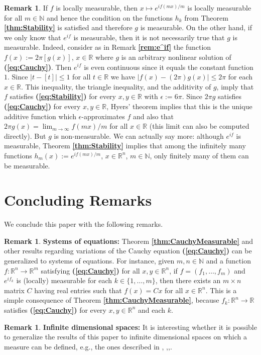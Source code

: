 \documentclass[12 pt]{amsart}
\theoremstyle{definition}
\newtheorem{remark}[thm]{Remark}
\newcommand{\R}{\mathbb{R}}
\newcommand{\N}{\mathbb{N}}
\newcommand{\bref}[1]{\textbf{\ref{#1}}} %
\newcommand{\beqref}[1]{\textbf{(\ref{#1})}} %
\begin{document}
\begin{remark}\label{rem:exp_fm}
If $f$ is locally measurable, then $x\mapsto e^{if(mx)/m}$ is locally measurable for all $m\in\N$ and hence the condition on the functions $h_k$ from Theorem \bref{thm:Stability} is satisfied and therefore $g$ is measurable. On the other hand, if we only know that $e^{if}$ is measurable, then it is not necessarily true that $g$ is measurable. Indeed, consider as in Remark \bref{rem:e^if} 
the function $f(x):=2\pi[g(x)]$, $x\in\R$ where $g$ is an arbitrary nonlinear solution of \beqref{eq:Cauchy}. 
Then $e^{if}$ is even continuous since it equals the constant function $1$. Since $|t-[t]|\leq 1$ for all $t\in\R$ we have $|f(x)-(2\pi)g(x)|\leq 2\pi$ for each $x\in \R$. This inequality, the  triangle inequality, and the additivity of $g$,  imply that $f$ satisfies \beqref{eq:Stability} for every $x,y\in\R$ with $\epsilon:=6\pi$. Since $2\pi g$ satisfies \beqref{eq:Cauchy} for every $x,y\in\R$, 
Hyers' theorem implies that this is the unique additive function which $\epsilon$-approximates $f$ 
and also that $2\pi g(x)=\lim_{m\to\infty}f(mx)/m$ for all $x\in \R$ (this limit can also be 
 computed directly). But $g$ is non-measurable. We can actually say more:  
although $e^{if}$ is measurable, Theorem \bref{thm:Stability} 
implies that among the infinitely many functions $h_m(x):=e^{if(mx)/m}$, $x\in\R^n$, $m\in\N$, only finitely many of them can be measurable. 
\end{remark}

\section{Concluding Remarks}\label{sec:Remarks}
We conclude this paper with the following remarks. 
\begin{remark} {\bf Systems of equations:} 
Theorem \bref{thm:CauchyMeasurable} and other results regarding variations 
of the Cauchy equation \beqref{eq:Cauchy} can be generalized to systems of equations. For instance, 
given $m,n\in \N$ and a function $f:\R^n\to \R^m$ satisfying \beqref{eq:Cauchy} for all $x,y\in\R^n$, if $f=(f_1,\ldots,f_m)$ and $e^{if_k}$ is (locally) measurable for each $k\in\{1,\ldots,m\}$, then there exists an $m\times n$ matrix $C$ having real entries such that  $f(x)=Cx$ for all $x\in\R^n$. This is a simple consequence of Theorem \bref{thm:CauchyMeasurable}, because $f_k:\R^n\to\R$ satisfies \beqref{eq:Cauchy} for every $x,y\in\R^n$ and each $k$. 
\end{remark}
\begin{remark}
{\bf Infinite dimensional spaces:} It is interesting whether it is possible to generalize the results of this paper  to infinite dimensional spaces on which a measure can be defined, e.g., the ones described in \cite{Daoxing1972}, 
\cite[pp. 154--160]{Halmos1974},\cite[pp. 157--166]{Henstock1991},\cite{Yamasaki1985}. 
\end{remark}
\end{document}
